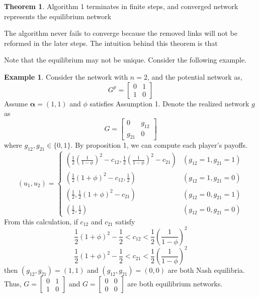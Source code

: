 \documentclass[12pt]{article}
\theoremstyle{definition}
\newtheorem{theorem}{Theorem}
\newtheorem{example}{Example}
\begin{document}
\begin{theorem}
Algorithm 1 terminates in finite steps, and converged network represents the equilibrium network
\end{theorem}

The algorithm never fails to converge because the removed links will not be reformed in the later steps.
The intuition behind this theorem is that

Note that the equilibrium may not be unique.
Consider the following example.

\begin{example}
Consider the network with $n=2$, and the potential network as,
\[ G^p = \left[
	\begin{array}{cc}
		0 & 1 \\
		1 & 0
	\end{array} \right] \]
Assume $\bm{\alpha} = (1, 1)$ and $\phi$ satisfies Assumption 1.
Denote the realized network $g$ as
\[ G = \left[
	\begin{array}{cc}
		0 & g_{12} \\
		g_{21} & 0
	\end{array} \right] \]
where $g_{12}, g_{21} \in \{0,1\}$.
By proposition 1, we can compute each player's payoffs.
\[ (u_1, u_2) =
	\begin{cases}
		\left( \frac{1}{2}{\left( \frac{1}{1 - \phi} \right)}^2 - c_{12}, \frac{1}{2}{\left( \frac{1}{1 - \phi} \right)}^2 - c_{21} \right) & (g_{12} = 1, g_{21} = 1) \\
		\left( \frac{1}{2}{(1+\phi)}^2 - c_{12}, \frac{1}{2} \right) & (g_{12} = 1, g_{21} = 0) \\
		\left( \frac{1}{2}, \frac{1}{2}{(1+\phi)}^2 - c_{21} \right) & (g_{12} = 0, g_{21} = 1) \\
		\left( \frac{1}{2}, \frac{1}{2} \right) & (g_{12} = 0, g_{21} = 0)
	\end{cases} \]
From this calculation, if $c_{12}$ and $c_{21}$ satisfy
\[ \frac{1}{2}{(1+\phi)}^2 - \frac{1}{2} < c_{12} < \frac{1}{2}{\left( \frac{1}{1 - \phi} \right)}^2 \]
\[ \frac{1}{2}{(1+\phi)}^2 - \frac{1}{2} < c_{21} < \frac{1}{2}{\left( \frac{1}{1 - \phi} \right)}^2 \]
then $(g_{12}, g_{21}) = (1,1)$ and $(g_{12}, g_{21}) = (0,0)$ are both Nash equilibria.
Thus, $G = \left[
	\begin{array}{cc}
		0 & 1 \\
		1 & 0
	\end{array} \right]$
and $G = \left[
	\begin{array}{cc}
		0 & 0 \\
		0 & 0
	\end{array} \right]$
are both equilibrium networks.
\end{example}
\end{document}
